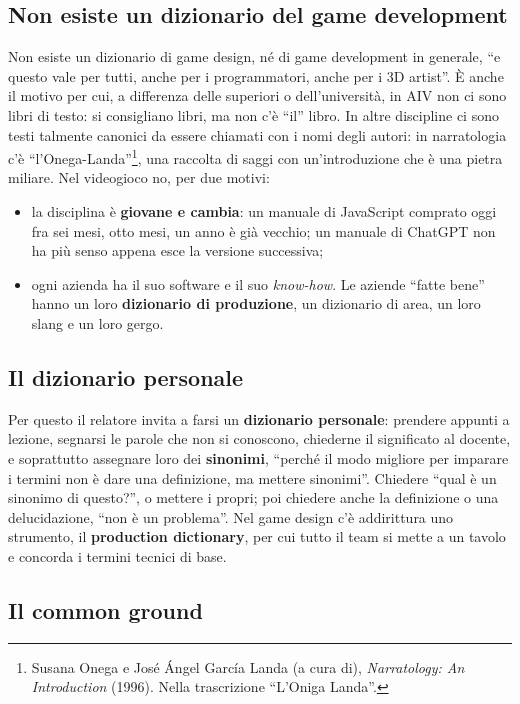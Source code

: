 \subsection{Non esiste un dizionario del game development}

Non esiste un dizionario di game design, né di game development in generale,
``e questo vale per tutti, anche per i programmatori, anche per i 3D artist''.
È anche il motivo per cui, a differenza delle superiori o dell'università, in
AIV non ci sono libri di testo: si consigliano libri, ma non c'è ``il'' libro.
In altre discipline ci sono testi talmente canonici da essere chiamati con i
nomi degli autori: in narratologia c'è ``l'Onega-Landa''\footnote{Susana Onega
e José Ángel García Landa (a cura di), \emph{Narratology: An Introduction}
(1996). Nella trascrizione ``L'Oniga Landa''.}, una raccolta di saggi con
un'introduzione che è una pietra miliare. Nel videogioco no, per due motivi:
\begin{itemize}
  \item la disciplina è \textbf{giovane e cambia}: un manuale di JavaScript
        comprato oggi fra sei mesi, otto mesi, un anno è già vecchio; un
        manuale di ChatGPT non ha più senso appena esce la versione successiva;
  \item ogni azienda ha il suo software e il suo \emph{know-how}. Le aziende
        ``fatte bene'' hanno un loro \textbf{dizionario di produzione}, un
        dizionario di area, un loro slang e un loro gergo.
\end{itemize}

\subsection{Il dizionario personale}

Per questo il relatore invita a farsi un \textbf{dizionario personale}:
prendere appunti a lezione, segnarsi le parole che non si conoscono, chiederne
il significato al docente, e soprattutto assegnare loro dei \textbf{sinonimi},
``perché il modo migliore per imparare i termini non è dare una definizione, ma
mettere sinonimi''. Chiedere ``qual è un sinonimo di questo?'', o mettere i
propri; poi chiedere anche la definizione o una delucidazione, ``non è un
problema''. Nel game design c'è addirittura uno strumento, il
\textbf{production dictionary}, per cui tutto il team si mette a un tavolo e
concorda i termini tecnici di base.

\subsection{Il common ground}

